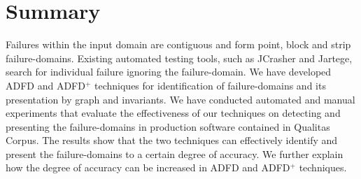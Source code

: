 \section{Summary} \label{sec:conclusion}
Failures within the input domain are contiguous and form point, block and strip failure-domains. Existing automated testing tools, such as JCrasher and Jartege, search for individual failure ignoring the failure-domain. We have developed ADFD and ADFD$^+$ techniques for identification of failure-domains and its presentation by graph and invariants. We have conducted automated and manual experiments that evaluate the effectiveness of our techniques on detecting and presenting the failure-domains in production software contained in Qualitas Corpus. The results show that the two techniques can effectively identify and present the failure-domains to a certain degree of accuracy. We further explain how the degree of accuracy can be increased in ADFD and ADFD$^+$ techniques.  
\smallskip



